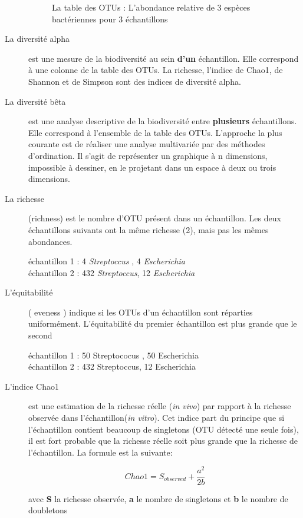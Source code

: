 \documentclass[12pt,a4paper]{article}
\begin{document}
\begin{description}
\begin{figure}[h]
\begin{center}
\begin{tabular}{|l|c|c|c|c}
  \hline
\end{tabular}
\end{center}
\caption{La table des OTUs : L'abondance relative de 3 espèces bactériennes pour 3 échantillons}
\label{OTUTABLE}
\end{figure}

\item[La diversité alpha] est une mesure de la biodiversité au sein \textbf{d’un} échantillon. Elle correspond à une colonne de la table des OTUs. La richesse, l'indice de Chao1, de Shannon et de Simpson sont des indices de diversité alpha.

\item[La diversité bêta] est une analyse descriptive de la biodiversité entre \textbf{plusieurs} échantillons. Elle correspond à l’ensemble de la table des OTUs. L’approche la plus courante est de réaliser une analyse multivariée par des méthodes d’ordination. Il s’agit de représenter un graphique à n dimensions, impossible à dessiner, en le projetant dans un espace à deux ou trois dimensions.

\item[La richesse] (richness) est le nombre d'OTU présent dans un échantillon. Les deux échantillons suivants ont la même richesse (2), mais pas les mêmes abondances.

échantillon 1  : 4 \textit{Streptoccus} , 4 \textit{Escherichia}  \\ 
échantillon 2 : 432 \textit{Streptoccus}, 12 \textit{Escherichia} 

\item[L'équitabilité] ( eveness )  indique si les OTUs d’un échantillon sont réparties uniformément.
L'équitabilité du premier échantillon est plus grande que le second

échantillon 1  : 50 Streptococus , 50 Escherichia  \\ 
échantillon 2 : 432 Streptoccus, 12 Escherichia 


\item[L'indice Chao1] est une estimation de la richesse réelle (\textit{in vivo}) par rapport à la richesse observée dans l'échantillon(\textit{in vitro}). Cet indice part du principe que si l’échantillon contient beaucoup de singletons (OTU détecté une seule fois), il est fort probable que la richesse réelle soit plus grande que la richesse de l’échantillon. La formule est la suivante:

\begin{mycapequ}[!h]
   \begin{equation}
     Chao1 = S_{observed} + \frac{a^2}{2b}
   \end{equation}
      \caption{avec \textbf{S} la richesse observée, \textbf{a} le nombre de singletons et \textbf{b} le nombre de doubletons}
\end{mycapequ}


\end{description}
\end{document}
